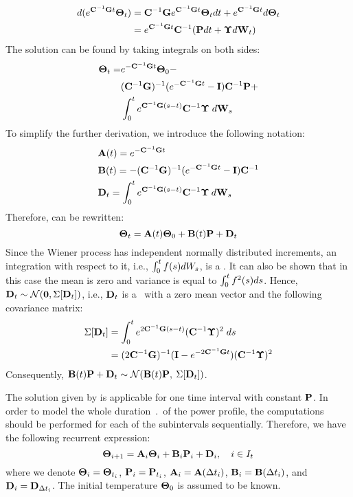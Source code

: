 \begin{align*}
  d(e^{\mathbf{C}^{-1} \mathbf{G} t} \mathbf{\Theta}_t) & = \mathbf{C}^{-1} \mathbf{G} e^{\mathbf{C}^{-1} \mathbf{G} t} \mathbf{\Theta}_t dt + e^{\mathbf{C}^{-1} \mathbf{G} t} d\mathbf{\Theta}_t \\
  & = e^{\mathbf{C}^{-1} \mathbf{G} t} \mathbf{C}^{-1} (\mathbf{P} dt + \mathbf{\Upsilon} d\mathbf{W}_t)
\end{align*}
The solution can be found by taking integrals on both sides:
\begin{align} \equlabel{solution-full}
  \vtemperature_\time = & \emcgt{} \vtemperature_0 - \\
    & (\cg)^{-1}(\emcgt{} - \mone) \mcapacitance^{-1} \vpower + \nonumber \\
    & \int_0^\time \ecg{}{(s - \time)} \mcapacitance^{-1} \mnoisedeviation \; d\m{W}_s \nonumber
\end{align}
To simplify the further derivation, we introduce the following notation:
\begin{align*}
  & \mathbf{A}(t) = e^{- \mathbf{C}^{-1} \mathbf{G} t} \\
  & \mathbf{B}(t) = -(\mathbf{C}^{-1} \mathbf{G})^{-1}(e^{- \mathbf{C}^{-1} \mathbf{G} t} - \mathbf{I}) \mathbf{C}^{-1} \\
  & \mathbf{D}_t = \int_0^{t} e^{ \mathbf{C}^{-1} \mathbf{G} (s - t)} \mathbf{C}^{-1} \mathbf{\Upsilon} \: d\mathbf{W}_s
\end{align*}
Therefore,  can be rewritten:
\[
  \mathbf{\Theta}_t = \mathbf{A}(t) \mathbf{\Theta}_0 + \mathbf{B}(t) \mathbf{P} + \mathbf{D}_t
\]
Since the Wiener process has independent normally distributed increments, an integration with respect to it, i.e., $\int_0^t f(s) dW_s$, is a \nrv. It can also be shown that in this case the mean is zero and variance is equal to $\int_0^t f^2(s) ds$. Hence, $\mathbf{D}_t \sim \mathcal{N}(\mathbf{0}, \Sigma[\mathbf{D}_t])$, i.e., $\mathbf{D}_t$ is a \mnrv\ with a zero mean vector and the following covariance matrix:
\begin{align}
  \covariance{\v{D}_\time} & = \int_0^\time \ecg{2}{(s - \time)} (\mcapacitance^{-1} \mnoisedeviation)^2 \; ds \nonumber \\
  & = (2 \cg)^{-1} (\mone - \emcgt{2}) (\mcapacitance^{-1} \mnoisedeviation)^2 \equlabel{covariance-d}
\end{align}
Consequently, $\mathbf{B}(t) \mathbf{P} + \mathbf{D}_t \sim \mathcal{N}(\mathbf{B}(t) \mathbf{P}, \: \Sigma[\mathbf{D}_t])$.

The solution given by  is applicable for one time interval with constant $\mathbf{P}$. In order to model the whole duration $\period$ of the power profile, the computations should be performed for each of the subintervals sequentially. Therefore, we have the following recurrent expression:
\begin{equation} \equlabel{fourier-recurrence-noise}
  \vtemperature_{i + 1} = \m{A}_i \vtemperature_i + \m{B}_i \vpower_i + \m{D}_i, \sep i \in \timeindex
\end{equation}
where we denote $\mathbf{\Theta}_i = \mathbf{\Theta}_{t_i}$, $\mathbf{P}_i = \mathbf{P}_{t_i}$, $\mathbf{A}_i = \mathbf{A}(\Delta t_i)$, $\mathbf{B}_i = \mathbf{B}(\Delta t_i)$, and $\mathbf{D}_i = \mathbf{D}_{\Delta t_i}$. The initial temperature $\mathbf{\Theta}_0$ is assumed to be known.

